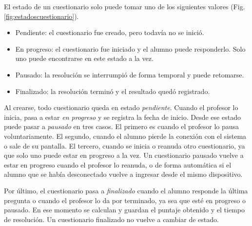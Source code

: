 El estado de un cuestionario solo puede tomar uno de los siguientes valores (Fig. \ref{fig:estadoscuestionario}).

\begin{itemize}

\item Pendiente: el cuestionario fue creado, pero todavía no se inició.

\item En progreso: el cuestionario fue iniciado y el alumno puede responderlo. Solo uno puede encontrarse en este estado a la vez.

\item Pausado: la resolución se interrumpió de forma temporal y puede retomarse.

\item Finalizado: la resolución terminó y el resultado quedó registrado.

\end{itemize}


Al crearse, todo cuestionario queda en estado \emph{pendiente}. Cuando el profesor lo inicia, pasa a estar \emph{en progreso} y se registra la fecha de inicio. Desde ese estado puede pasar a \emph{pausado} en tres casos. El primero es cuando el profesor lo pausa voluntariamente. El segundo, cuando el alumno pierde la conexión con el sistema o sale de su pantalla. El tercero, cuando se inicia o reanuda otro cuestionario, ya que solo uno puede estar en progreso a la vez. Un cuestionario pausado vuelve a estar en progreso cuando el profesor lo reanuda, o de forma automática si el alumno que se había desconectado vuelve a ingresar desde el mismo dispositivo.

Por último, el cuestionario pasa a \emph{finalizado} cuando el alumno responde la última pregunta o cuando el profesor lo da por terminado, ya sea que esté en progreso o pausado. En ese momento se calculan y guardan el puntaje obtenido y el tiempo de resolución. Un cuestionario finalizado no vuelve a cambiar de estado.

